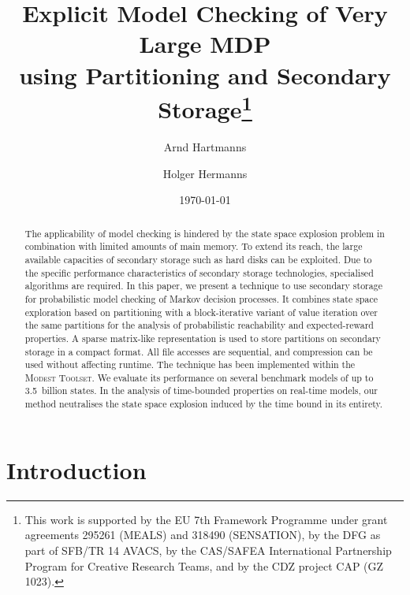\documentclass{llncs}
\newcommand{\toolset}{\textsc{\mbox{Modest} Toolset}\xspace}
\begin{document}
\title{Explicit Model Checking of Very Large MDP \\using Partitioning and Secondary Storage\thanks{This work is supported by the EU 7th Framework Programme under grant agreements 295261 (MEALS) and 318490 (SENSATION), by the DFG as part of  SFB/TR 14 AVACS, by the CAS/SAFEA International Partnership Program for Creative Research Teams, and by the CDZ project CAP (GZ 1023).}}
\author{
Arnd Hartmanns \and
Holger Hermanns
}

\date{\today}
\maketitle

\begin{abstract}
The applicability of model checking is hindered by the state space explosion problem in combination with limited amounts of main memory.
To extend its reach, the large available capacities of secondary storage such as hard disks can be exploited.
Due to the specific performance characteristics of secondary storage technologies, specialised algorithms are required.
In this paper, we present a technique to use secondary storage for probabilistic model checking of Markov decision processes.
It combines state space exploration based on partitioning with a block-iterative variant of value iteration over the same partitions for the analysis of probabilistic reachability and expected-reward properties.
A sparse matrix-like representation is used to store partitions on secondary storage in a compact format.
All file accesses are sequential, and compression can be used without affecting runtime.
The technique has been implemented within the \toolset.
We evaluate its performance on several benchmark models of up to 3.5~billion states.
In the analysis of time-bounded properties on real-time models, our method neutralises the state space explosion induced by the time bound in its entirety.
\end{abstract}




\section{Introduction}
\label{sec:Introduction}
\end{document}
